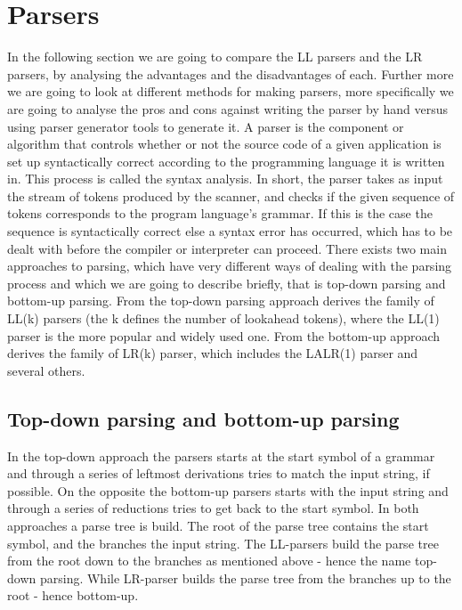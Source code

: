 \section{Parsers}
\label{sec:parsers}

In the following section we are going to compare the LL parsers and the LR parsers, by analysing the advantages and the disadvantages of each. Further more we are going to look at different methods for making parsers, more specifically we are going to analyse the pros and cons against writing the parser by hand versus using parser generator tools to generate it. A parser is the component or algorithm that controls whether or not the source code of a given application is set up syntactically correct according to the programming language it is written in. This process is called the syntax analysis. In short, the parser takes as input the stream of tokens produced by the scanner, and checks if the given sequence of tokens corresponds to the program language's grammar. If this is the case the sequence is syntactically correct else a syntax error has occurred, which has to be dealt with before the compiler or interpreter can proceed. There exists two main approaches to parsing, which have very different ways of dealing with the parsing process and which we are going to describe briefly, that is top-down parsing and bottom-up parsing. From the top-down parsing approach derives the family of LL(k) parsers (the k defines the number of lookahead tokens), where the LL(1) parser is the more popular and widely used one. From the bottom-up approach derives the family of LR(k) parser, which includes the LALR(1) parser and several others.

\subsection{Top-down parsing and bottom-up parsing}

In the top-down approach the parsers starts at the start symbol of a grammar and through a series of leftmost derivations tries to match the input string, if possible. On the opposite the bottom-up parsers starts with the input string and through a series of reductions tries to get back to the start symbol. In both approaches a parse tree is build. The root of the parse tree contains the start symbol, and the branches the input string. The LL-parsers
build the parse tree from the root down to the branches as mentioned above - hence the name top-down parsing. While LR-parser builds the parse tree from the branches up to the root - hence bottom-up.

